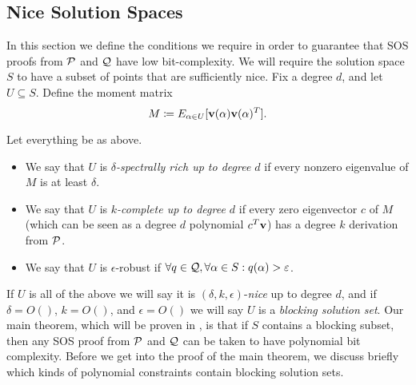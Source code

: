 \subsection{Nice Solution Spaces}
In this section we define the conditions we require in order to guarantee that SOS proofs from $\mathcal P$ and $\mathcal Q$ have low bit-complexity. We will require the solution space $S$ to have a subset of points that are sufficiently nice. Fix a degree $d$, and let $U \subseteq S$. Define the moment matrix
\[M \coloneqq E_{\alpha \in U}[{\bf v}(\alpha){\bf v}(\alpha)^T].\]
\begin{definition}
Let everything be as above. 
\begin{itemize}
\item We say that $U$ is \emph{$\delta$-spectrally rich up to degree $d$} if every nonzero eigenvalue of $M$ is at least $\delta$.
\item We say that $U$ is \emph{$k$-complete up to degree $d$} if every zero eigenvector $c$ of $M$ (which can be seen as a degree $d$ polynomial $c^T{\bf v}$) has a degree $k$ derivation from $\mathcal P$. 
\item We say that $U$ is $\epsilon$-robust if $\forall q \in \mathcal Q, \forall \alpha \in S: q(\alpha) > \varepsilon$.
\end{itemize}
\end{definition}
If $U$ is all of the above we will say it is $(\delta, k, \epsilon)$-\emph{nice} up to degree $d$, and if $\delta = O()$, $k = O()$, and $\epsilon = O()$ we will say $U$ is a \emph{blocking solution set}. Our main theorem, which will be proven in , is that if $S$ contains a blocking subset, then any SOS proof from $\mathcal P$ and $\mathcal Q$ can be taken to have polynomial bit complexity. Before we get into the proof of the main theorem, we discuss briefly which kinds of polynomial constraints contain blocking solution sets. 

